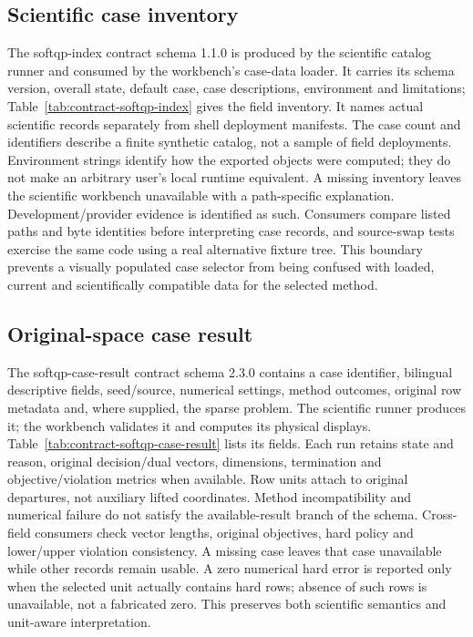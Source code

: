 \subsection{Scientific case inventory}\label{sec:contract-softqp-index}
The softqp-index contract schema 1.1.0 is produced by the scientific catalog
runner and consumed by the workbench's case-data loader. It carries its schema
version, overall state, default case, case descriptions, environment and
limitations; Table~\ref{tab:contract-softqp-index} gives the field inventory.
It names actual scientific records separately from shell deployment manifests.
The case count and identifiers describe a finite synthetic catalog, not a
sample of field deployments. Environment strings identify how the exported
objects were computed; they do not make an arbitrary user's local runtime
equivalent. A missing inventory leaves the scientific workbench unavailable
with a path-specific explanation. Development/provider evidence is identified
as such. Consumers compare listed paths and byte identities before interpreting
case records, and source-swap tests exercise the same code using a real
alternative fixture tree. This boundary prevents a visually populated case
selector from being confused with loaded, current and scientifically compatible
data for the selected method.


\subsection{Original-space case result}\label{sec:contract-softqp-case-result}
The softqp-case-result contract schema 2.3.0 contains a case identifier, bilingual
descriptive fields, seed/source, numerical settings, method outcomes, original
row metadata and, where supplied, the sparse problem. The scientific runner
produces it; the workbench validates it and computes its physical displays.
Table~\ref{tab:contract-softqp-case-result} lists its fields. Each run retains
state and reason, original decision/dual vectors, dimensions, termination and
objective/violation metrics when available. Row units attach to original
departures, not auxiliary lifted coordinates. Method incompatibility and
numerical failure do not satisfy the available-result branch of the schema.
Cross-field consumers check vector lengths, original objectives, hard policy
and lower/upper violation consistency. A missing case leaves that case
unavailable while other records remain usable. A zero numerical hard error is
reported only when the selected unit actually contains hard rows; absence of
such rows is unavailable, not a fabricated zero. This preserves both scientific
semantics and unit-aware interpretation.


